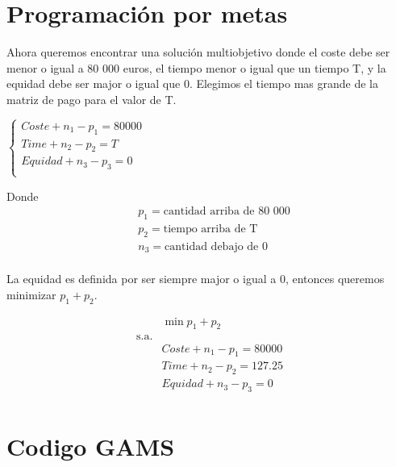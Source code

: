 \documentclass[]{article}
\begin{document}
  \begin{table}[H]
\begin{center}
\caption{matriz de pagos}
\label{tab:dfdg}
\end{center}
\end{table}



\section{Programación por metas}


Ahora queremos encontrar una solución multiobjetivo donde el coste debe ser menor o igual a 80 000 euros, el tiempo menor o igual que un tiempo T, y la equidad debe ser major o igual que 0. Elegimos el tiempo mas grande de la matriz de pago para el valor de T. \\


\begin{center}
$
\begin{cases}
Coste + n_1 - p_1 = 80 000 \\
Time + n_2 - p_2 = T \\
Equidad+ n_3 - p_3 = 0\\
\end{cases}
$
\end{center}

\noindent Donde 
\begin{align*}
& p_1 = \text{cantidad arriba de 80 000} \\
& p_2 = \text{tiempo arriba de T} \\
& n_3 = \text{cantidad debajo de 0} \\
\end{align*}

\noindent La equidad es definida por ser siempre major o igual a 0, entonces queremos minimizar $p_1 + p_2$.

\begin{align*}
&\min p_1+p_2 \\
\text{s.a.} \\
& Coste + n_1 - p_1 = 80 000 \\
&Time + n_2 - p_2 = 127.25 \\
&Equidad+ n_3 - p_3 = 0\\
\end{align*}



\section{Codigo GAMS}
\end{document}
